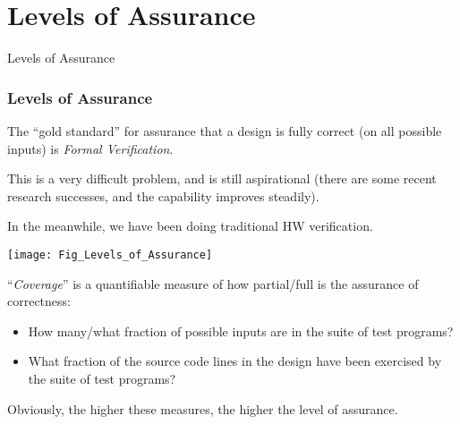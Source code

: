 
\section{Levels of Assurance}

\begin{frame}

\begin{center}
  {\LARGE Levels of Assurance}
\end{center}

\end{frame}


\begin{frame}
\frametitle{Levels of Assurance}

\footnotesize

\begin{minipage}{0.28\textwidth}

  The ``gold standard'' for assurance that a design is fully correct
  (on all possible inputs) is \emph{Formal Verification}.

  \vx

  This is a very difficult problem, and is still aspirational (there
  are some recent research successes, and the capability improves
  steadily).

  \vxx

  In the meanwhile, we have been doing traditional HW verification.  

\end{minipage}
\hfill
\begin{minipage}{0.7\textwidth}
  \texttt{[image: Fig\_Levels\_of\_Assurance]}
\end{minipage}

\vxxxx

``\emph{Coverage}'' is a quantifiable measure of how partial/full is
the assurance of correctness:

\begin{itemize}\scriptsize
  \item How many/what fraction of possible inputs are in the suite of test programs?

  \item What fraction of the source code lines in the design have been
        exercised by the suite of test programs?
\end{itemize}
Obviously, the higher these measures, the higher the level of assurance.

\end{frame}

